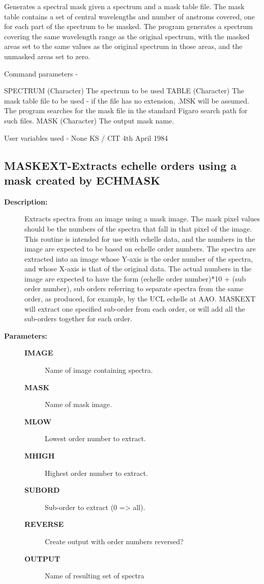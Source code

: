 \begin{description}
\begin{description}
\begin{terminalv}
 Generates a spectral mask given a spectrum and a mask
 table file.  The mask table contains a set of central
 wavelengths and number of anstroms covered, one for each
 part of the spectrum to be masked.  The program generates
 a spectrum covering the same wavelength range as the
 original spectrum, with the masked areas set to the same
 values as the original spectrum in those areas, and the
 unmasked areas set to zero.

 Command parameters -

 SPECTRUM   (Character) The spectrum to be used
 TABLE      (Character) The mask table file to be used - if
            the file has no extension, .MSK will be assumed.
            The program searches for the mask file in the
            standard Figaro search path for such files.
 MASK       (Character) The output mask name.

 User variables used - None
                                      KS / CIT 4th April 1984
\end{terminalv}
\end{description}
\subsection{MASKEXT-\label{MASKEXT}Extracts echelle orders using a mask created by ECHMASK}
\begin{description}

\item [\textbf{Description:}]
 Extracts spectra from an image using a mask image.  The mask
 pixel values should be the numbers of the spectra that fall
 in that pixel of the image.  This routine is intended for use
 with echelle data, and the numbers in the image are expected
 to be based on echelle order numbers.  The spectra are extracted
 into an image whose Y-axis is the order number of the spectra,
 and whose X-axis is that of the original data.  The actual
 numbers in the image are expected to have the form
 (echelle order number)*10 + (sub order number), sub orders
 referring to separate spectra from the same order, as
 produced, for example, by the UCL echelle at AAO.
 MASKEXT will extract one specified sub-order from each
 order, or will add all the sub-orders together for each order.

\item [\textbf{Parameters:}]
\begin{description}
\item [\textbf{IMAGE}]
 Name of image containing spectra.
\item [\textbf{MASK}]
 Name of mask image.
\item [\textbf{MLOW}]
 Lowest order number to extract.
\item [\textbf{MHIGH}]
 Highest order number to extract.
\item [\textbf{SUBORD}]
 Sub-order to extract (0 => all).
\item [\textbf{REVERSE}]
 Create output with order numbers reversed?
\item [\textbf{OUTPUT}]
 Name of resulting set of spectra
\end{description}


\end{description}
\end{description}
